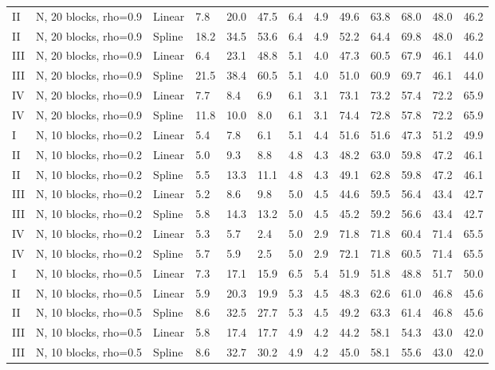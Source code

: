 \documentclass{article}\usepackage[]{graphicx}\usepackage[]{color}
\begin{document}
\begin{table}[ht]
\begin{tabular}{lll|lllll|lllll}
  II & N, 20 blocks, rho=0.9 & Linear & 7.8 & 20.0 & 47.5 & 6.4 & 4.9 & 49.6 & 63.8 & 68.0 & 48.0 & 46.2 \\ 
  II & N, 20 blocks, rho=0.9 & Spline & 18.2 & 34.5 & 53.6 & 6.4 & 4.9 & 52.2 & 64.4 & 69.8 & 48.0 & 46.2 \\ 
  III & N, 20 blocks, rho=0.9 & Linear & 6.4 & 23.1 & 48.8 & 5.1 & 4.0 & 47.3 & 60.5 & 67.9 & 46.1 & 44.0 \\ 
  III & N, 20 blocks, rho=0.9 & Spline & 21.5 & 38.4 & 60.5 & 5.1 & 4.0 & 51.0 & 60.9 & 69.7 & 46.1 & 44.0 \\ 
  IV & N, 20 blocks, rho=0.9 & Linear & 7.7 & 8.4 & 6.9 & 6.1 & 3.1 & 73.1 & 73.2 & 57.4 & 72.2 & 65.9 \\ 
  IV & N, 20 blocks, rho=0.9 & Spline & 11.8 & 10.0 & 8.0 & 6.1 & 3.1 & 74.4 & 72.8 & 57.8 & 72.2 & 65.9 \\ 
   \hline
I & N, 10 blocks, rho=0.2 & Linear & 5.4 & 7.8 & 6.1 & 5.1 & 4.4 & 51.6 & 51.6 & 47.3 & 51.2 & 49.9 \\ 
  II & N, 10 blocks, rho=0.2 & Linear & 5.0 & 9.3 & 8.8 & 4.8 & 4.3 & 48.2 & 63.0 & 59.8 & 47.2 & 46.1 \\ 
  II & N, 10 blocks, rho=0.2 & Spline & 5.5 & 13.3 & 11.1 & 4.8 & 4.3 & 49.1 & 62.8 & 59.8 & 47.2 & 46.1 \\ 
  III & N, 10 blocks, rho=0.2 & Linear & 5.2 & 8.6 & 9.8 & 5.0 & 4.5 & 44.6 & 59.5 & 56.4 & 43.4 & 42.7 \\ 
  III & N, 10 blocks, rho=0.2 & Spline & 5.8 & 14.3 & 13.2 & 5.0 & 4.5 & 45.2 & 59.2 & 56.6 & 43.4 & 42.7 \\ 
  IV & N, 10 blocks, rho=0.2 & Linear & 5.3 & 5.7 & 2.4 & 5.0 & 2.9 & 71.8 & 71.8 & 60.4 & 71.4 & 65.5 \\ 
  IV & N, 10 blocks, rho=0.2 & Spline & 5.7 & 5.9 & 2.5 & 5.0 & 2.9 & 72.1 & 71.8 & 60.5 & 71.4 & 65.5 \\ 
   \hline
I & N, 10 blocks, rho=0.5 & Linear & 7.3 & 17.1 & 15.9 & 6.5 & 5.4 & 51.9 & 51.8 & 48.8 & 51.7 & 50.0 \\ 
  II & N, 10 blocks, rho=0.5 & Linear & 5.9 & 20.3 & 19.9 & 5.3 & 4.5 & 48.3 & 62.6 & 61.0 & 46.8 & 45.6 \\ 
  II & N, 10 blocks, rho=0.5 & Spline & 8.6 & 32.5 & 27.7 & 5.3 & 4.5 & 49.2 & 63.3 & 61.4 & 46.8 & 45.6 \\ 
  III & N, 10 blocks, rho=0.5 & Linear & 5.8 & 17.4 & 17.7 & 4.9 & 4.2 & 44.2 & 58.1 & 54.3 & 43.0 & 42.0 \\ 
  III & N, 10 blocks, rho=0.5 & Spline & 8.6 & 32.7 & 30.2 & 4.9 & 4.2 & 45.0 & 58.1 & 55.6 & 43.0 & 42.0 \\ 

\end{tabular}
\end{table}
\end{document}
